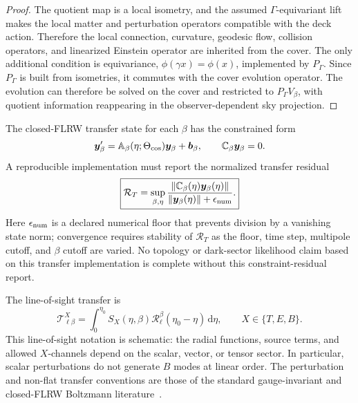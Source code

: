 \documentclass[
  aps,
  prd,
  reprint,
  superscriptaddress,
  floatfix,
  nofootinbib,
  longbibliography
]{revtex4-2}
\theoremstyle{plain}
\theoremstyle{definition}
\theoremstyle{remark}
\newcommand{\dd}{\mathrm d}
\newcommand{\PG}{P_{\Gamma}}
\newcommand{\Tcal}{\mathcal T}
\begin{document}
\begin{proof}
The quotient map is a local isometry, and the assumed $\Gamma$-equivariant lift makes the local matter and perturbation operators compatible with the deck action.  Therefore the local connection, curvature, geodesic flow, collision operators, and linearized Einstein operator are inherited from the cover.  The only additional condition is equivariance, $\phi(\gamma x)=\phi(x)$, implemented by $\PG$.  Since $\PG$ is built from isometries, it commutes with the cover evolution operator.  The evolution can therefore be solved on the cover and restricted to $\PG V_\beta$, with quotient information reappearing in the observer-dependent sky projection.
\end{proof}

The closed-FLRW transfer state for each $\beta$ has the constrained form
\begin{equation}
\bm y_\beta'=\mathbb A_\beta(\eta;\Theta_{\rm cos})\bm y_\beta+\bm b_\beta,
\qquad
\mathbb C_\beta\bm y_\beta=0.
\label{eq:transfer_state}
\end{equation}
A reproducible implementation must report the normalized transfer residual
\begin{equation}
\boxed{
\mathcal R_T=
\sup_{\beta,\eta}
\frac{\|\mathbb C_\beta(\eta)\bm y_\beta(\eta)\|}
{\|\bm y_\beta(\eta)\|+\epsilon_{\rm num}} .}
\label{eq:transfer_residual}
\end{equation}
Here $\epsilon_{\rm num}$ is a declared numerical floor that prevents division by a vanishing state norm; convergence requires stability of $\mathcal R_T$ as the floor, time step, multipole cutoff, and $\beta$ cutoff are varied.  No topology or dark-sector likelihood claim based on this transfer implementation is complete without this constraint-residual report.

The line-of-sight transfer is
\begin{equation}
\Tcal_{\ell\beta}^{X}=
\int_0^{\eta_0}S_X(\eta,\beta)
\mathcal R_\ell^\beta(\eta_0-\eta)\,\dd\eta,
\qquad X\in\{T,E,B\}.
\label{eq:transfer_kernel}
\end{equation}
This line-of-sight notation is schematic: the radial functions, source terms, and allowed $X$-channels depend on the scalar, vector, or tensor sector.  In particular, scalar perturbations do not generate $B$ modes at linear order.  The perturbation and non-flat transfer conventions are those of the standard gauge-invariant and closed-FLRW Boltzmann literature~\cite{Bardeen1980,KodamaSasaki1984,TramLesgourgues2013,LesgourguesTram2014}.
\end{document}
